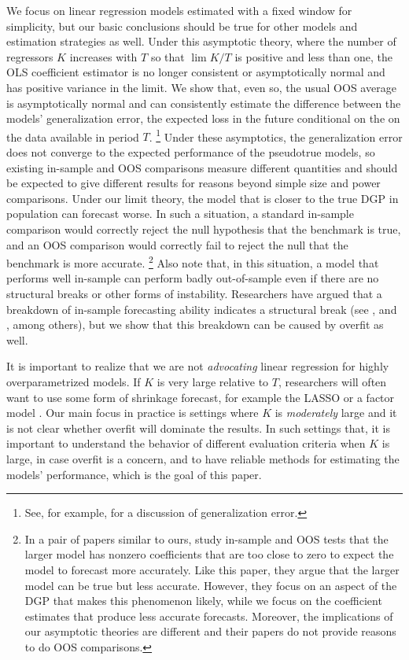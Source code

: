 \documentclass[12pt]{article}
\begin{document}
We focus on linear regression models estimated with a fixed window
for simplicity, but our basic conclusions should be true for other
models and estimation strategies as well.  Under this
asymptotic theory, where the number of regressors $K$ increases with $T$
so that $\lim K/T$ is positive and less than one,
the OLS coefficient estimator is no longer
consistent or asymptotically normal \citep{Hub:73} and has positive
variance in the limit.  We show that, even so, the usual OOS average
is asymptotically normal and can consistently estimate the difference
between the models' generalization error, the expected loss in the
future conditional on the on the data available in period
$T$.%
\footnote{See, for example, \citet{HTF:08} for a discussion of
  generalization error.} %
Under these asymptotics, the generalization
error does not converge to the expected performance of the pseudotrue
models, so existing in-sample and OOS comparisons measure different
quantities and should be expected to give different results for
reasons beyond simple size and power comparisons.  Under our limit theory,
the model that is closer to the true DGP in population can forecast
worse.  In such a situation, a standard in-sample comparison would
correctly reject the null hypothesis that the benchmark is true, and
an OOS comparison would correctly fail to reject the null that the
benchmark is more accurate.%
\footnote{In a pair of papers similar to
  ours, \citet{ClM:12,ClM:12b} study in-sample and OOS tests that
  the larger model has nonzero coefficients that are too close to zero
  to expect the model to forecast more accurately.  Like this paper,
  they argue that the larger model can be true but less accurate.
  However, they focus on an aspect of the DGP that makes this
  phenomenon likely, while we focus on the coefficient estimates that
  produce less accurate forecasts.  Moreover, the implications of our
  asymptotic theories are different and their papers do not provide
  reasons to do OOS comparisons.} %
Also note that, in this situation, a model that performs well
in-sample can perform badly out-of-sample even if there are no
structural breaks or other forms of instability.  Researchers
have argued that a breakdown of in-sample forecasting ability
indicates a structural break (see \citealp{BoH:99}, and
\citealp{StW:03}, among others), but we show that this breakdown
can be caused by overfit as well.

It is important to realize that we are not \emph{advocating} linear
regression for highly overparametrized models. If $K$ is very large
relative to $T$, researchers will often want to use some form of
shrinkage forecast, for example the LASSO \citep{Tib:96} or a factor
model \citep{StW:02,BaN:02}. Our main focus in practice is settings
where $K$ is \emph{moderately} large and it is not clear whether
overfit will dominate the results. In such settings that, it is
important to understand the behavior of different evaluation criteria
when $K$ is large, in case overfit is a concern, and to have reliable
methods for estimating the models' performance, which is the goal of
this paper.
\end{document}
